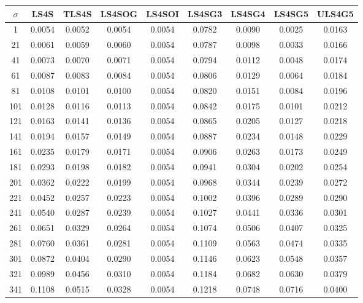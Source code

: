 \begin{table}[ht!]
\centering
\begin{tabular}{c|c|c|c|c|c|c|c|c}
$\sigma$ & \scriptsize{LS4S} & \scriptsize{TLS4S} & \scriptsize{LS4SOG} & \scriptsize{LS4SOI} & \scriptsize{LS4SG3} & \scriptsize{LS4SG4} & \scriptsize{LS4SG5} & \scriptsize{ULS4G5}\\ \hline 
1 & 0.0054 & 0.0052 & 0.0054 & 0.0054 & 0.0782 & 0.0090 & 0.0025 & 0.0163 \\ \hline
21 & 0.0061 & 0.0059 & 0.0060 & 0.0054 & 0.0787 & 0.0098 & 0.0033 & 0.0166 \\ \hline
41 & 0.0073 & 0.0070 & 0.0071 & 0.0054 & 0.0794 & 0.0112 & 0.0048 & 0.0174 \\ \hline
61 & 0.0087 & 0.0083 & 0.0084 & 0.0054 & 0.0806 & 0.0129 & 0.0064 & 0.0184 \\ \hline
81 & 0.0108 & 0.0101 & 0.0100 & 0.0054 & 0.0820 & 0.0151 & 0.0084 & 0.0196 \\ \hline
101 & 0.0128 & 0.0116 & 0.0113 & 0.0054 & 0.0842 & 0.0175 & 0.0101 & 0.0212 \\ \hline
121 & 0.0163 & 0.0141 & 0.0136 & 0.0054 & 0.0865 & 0.0205 & 0.0127 & 0.0218 \\ \hline
141 & 0.0194 & 0.0157 & 0.0149 & 0.0054 & 0.0887 & 0.0234 & 0.0148 & 0.0229 \\ \hline
161 & 0.0235 & 0.0179 & 0.0171 & 0.0054 & 0.0906 & 0.0263 & 0.0173 & 0.0249 \\ \hline
181 & 0.0293 & 0.0198 & 0.0182 & 0.0054 & 0.0941 & 0.0304 & 0.0202 & 0.0254 \\ \hline
201 & 0.0362 & 0.0222 & 0.0199 & 0.0054 & 0.0968 & 0.0344 & 0.0239 & 0.0272 \\ \hline
221 & 0.0452 & 0.0257 & 0.0223 & 0.0054 & 0.1002 & 0.0396 & 0.0289 & 0.0290 \\ \hline
241 & 0.0540 & 0.0287 & 0.0239 & 0.0054 & 0.1027 & 0.0441 & 0.0336 & 0.0301 \\ \hline
261 & 0.0651 & 0.0329 & 0.0264 & 0.0054 & 0.1074 & 0.0506 & 0.0407 & 0.0325 \\ \hline
281 & 0.0760 & 0.0361 & 0.0281 & 0.0054 & 0.1109 & 0.0563 & 0.0474 & 0.0335 \\ \hline
301 & 0.0872 & 0.0404 & 0.0290 & 0.0054 & 0.1146 & 0.0623 & 0.0548 & 0.0357 \\ \hline
321 & 0.0989 & 0.0456 & 0.0310 & 0.0054 & 0.1184 & 0.0682 & 0.0630 & 0.0379 \\ \hline
341 & 0.1108 & 0.0515 & 0.0328 & 0.0054 & 0.1218 & 0.0748 & 0.0716 & 0.0400 \\ \hline

\end{tabular}
\end{table}
